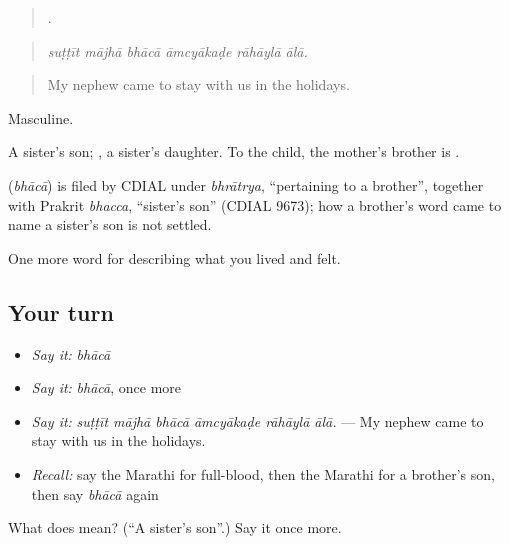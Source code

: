 \begin{quote}
     .
\end{quote}

\begin{quote}
\emph{suṭṭīt mājhā bhācā āmcyākaḍe rāhāylā ālā.}
\end{quote}

\begin{quote}
My nephew came to stay with us in the holidays.
\end{quote}

Masculine.

A sister's son; , a sister's daughter. To the child, the mother's brother is .

\begin{cousinweb}
\textbf{} (\emph{bhācā}) is filed by CDIAL under \emph{bhrātrya}, \textquotedblleft{}pertaining to a brother\textquotedblright{}, together with Prakrit \emph{bhacca}, \textquotedblleft{}sister's son\textquotedblright{} (CDIAL 9673); how a brother's word came to name a sister's son is not settled.
\end{cousinweb}

\begin{grammarlens}[title={What you've built}]
One more word for describing what you lived and felt.
\end{grammarlens}

\subsection*{Your turn}
\begin{itemize}
\raggedright
  \item \emph{Say it:} \emph{bhācā}
  \item \emph{Say it:} \emph{bhācā}, once more
  \item \emph{Say it:} \emph{suṭṭīt mājhā bhācā āmcyākaḍe rāhāylā ālā.} — My nephew came to stay with us in the holidays.
  \item \emph{Recall:} say the Marathi for full-blood, then the Marathi for a brother's son, then say \emph{bhācā} again
\end{itemize}

\begin{tcolorbox}[breakable,colback=teal!4,colframe=teal!35!black,title={Before you move on}]
What does  mean? (\textquotedblleft{}A sister's son\textquotedblright{}.) Say it once more.
\end{tcolorbox}
